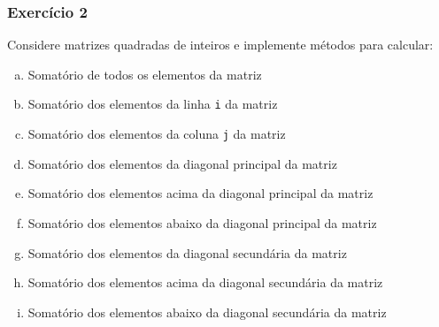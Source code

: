 \documentclass[xcolor={dvipsnames,table},aspectratio=169]{beamer}
\begin{document}
\begin{frame}\frametitle{Exercício 2}
Considere matrizes quadradas de inteiros e implemente métodos para calcular:
\begin{enumerate}[a)]
	\item Somatório de todos os elementos da matriz
	\item Somatório dos elementos da linha \texttt{i} da matriz
	\item Somatório dos elementos da coluna \texttt{j} da matriz
	\item Somatório dos elementos da diagonal principal da matriz
	\item Somatório dos elementos acima da diagonal principal da matriz
	\item Somatório dos elementos abaixo da diagonal principal da matriz
	\item Somatório dos elementos da diagonal secundária da matriz
	\item Somatório dos elementos acima da diagonal secundária da matriz
	\item Somatório dos elementos abaixo da diagonal secundária da matriz
\end{enumerate}
\end{frame}
\end{document}
